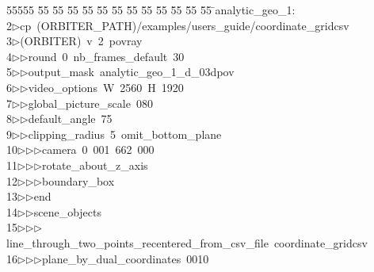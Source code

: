 %
%
\begin{tabbing}
55555 \= 55 \= 55 \= 55 \= 55 \= 55 \= 55 \= 55 \= 55 \= 55 \= 55 \= 55 \= 55 \= \>analytic\_geo\_1:\\[0pt]
2\>$\triangleright$\>cp\ (ORBITER\_PATH)/examples/users\_guide/coordinate\_gridcsv\ \\[0pt]
3\>$\triangleright$\>(ORBITER)\ v\ 2\ povray\ \\[0pt]
4\>$\triangleright$\>$\triangleright$\>round\ 0\ nb\_frames\_default\ 30\ \\[0pt]
5\>$\triangleright$\>$\triangleright$\>output\_mask\ analytic\_geo\_1\_d\_03dpov\ \\[0pt]
6\>$\triangleright$\>$\triangleright$\>video\_options\ W\ 2560\ H\ 1920\ \\[0pt]
7\>$\triangleright$\>$\triangleright$\>global\_picture\_scale\ 080\ \\[0pt]
8\>$\triangleright$\>$\triangleright$\>default\_angle\ 75\ \\[0pt]
9\>$\triangleright$\>$\triangleright$\>clipping\_radius\ 5\ omit\_bottom\_plane\ \ \\[0pt]
10\>$\triangleright$\>$\triangleright$\>$\triangleright$\>camera\ 0\ 001\ 662\ 000\ \ \\[0pt]
11\>$\triangleright$\>$\triangleright$\>$\triangleright$\>rotate\_about\_z\_axis\ \\[0pt]
12\>$\triangleright$\>$\triangleright$\>$\triangleright$\>boundary\_box\ \\[0pt]
13\>$\triangleright$\>$\triangleright$\>end\ \\[0pt]
14\>$\triangleright$\>$\triangleright$\>scene\_objects\ \\[0pt]
15\>$\triangleright$\>$\triangleright$\>$\triangleright$\>line\_through\_two\_points\_recentered\_from\_csv\_file\ coordinate\_gridcsv\ \\[0pt]
16\>$\triangleright$\>$\triangleright$\>$\triangleright$\>plane\_by\_dual\_coordinates\ 0010\ \\[0pt]

\end{tabbing}
